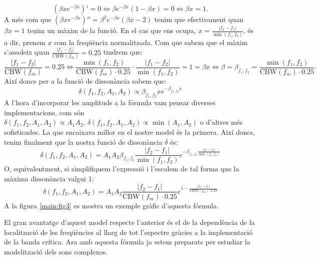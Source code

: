 \documentclass{article}
\theoremstyle{definition}
\begin{document}
$$\left(\beta xe^{-\beta x}\right)'=0\iff \beta e^{-\beta x}(1-\beta x)=0\iff\beta x=1.$$ A més com que $\left(\beta xe^{-\beta x}\right)''=\beta^2e^{-\beta x}(\beta x-2)$ tenim que efectivament quan $\beta x=1$ tenim un màxim de la funció.
En el cas que ens ocupa, $x=\frac{|f_2-f_1|}{\min(f_1,f_2)}$, és a dir, prenem $x$ com la freqüència normalitzada. Com que sabem que el màxim s'assoleix quan $\frac{|f_1-f_2|}{\text{CBW}(f_m)}=0.25$ tindrem que:
$$\frac{|f_1-f_2|}{\text{CBW}(f_m)}=0.25\iff\frac{\min(f_1, f_2)}{\text{CBW}(f_m)\cdot 0.25}\cdot\frac{|f_1-f_2|}{\min(f_1, f_2)}=1=\beta x\iff\beta=\beta_{f_1,f_2}=\frac{\min(f_1, f_2)}{\text{CBW}(f_m)\cdot 0.25}.$$
Així doncs per a la funció de dissonància sabem que: $$\delta(f_1,f_2,A_1,A_2)\propto\beta_{f_1,f_2}xe^{-\beta_{f_1,f_2}x}$$ A l'hora d'incorporar les amplituds a la fórmula vam pensar diverses implementacions, com són \\$\delta(f_1,f_2,A_1,A_2)\propto A_1A_2$, $\delta(f_1,f_2,A_1,A_2)\propto \min(A_1, A_2)$ o d'altres més sofisticades. La que encaixava millor en el nostre model és la primera. Així doncs, tenim finalment que la nostra funció de dissonància $\delta$ és:$$\delta(f_1,f_2,A_1,A_2)=A_1A_2\beta_{f_1,f_2}\frac{|f_2-f_1|}{\min(f_1,f_2)}e^{-\beta_{f_1,f_2}\frac{|f_2-f_1|}{\min(f_1,f_2)}}$$
O, equivalentment, si simplifiquem l'expressió i l'escalem de tal forma que la màxima dissonància valgui 1: 
\begin{equation}
    \delta(f_1,f_2,A_1,A_2)=A_1A_2\frac{|f_2-f_1|}{\text{CBW}(f_m)\cdot 0.25}e^{1-\frac{|f_2-f_1|}{\text{CBW}(f_m)\cdot 0.25}}
    \label{for:dissonancia}
\end{equation}
A la figura \ref{main:fig3} es mostra un exemple gràfic d'aquesta fórmula.
\begin{center}
    
    \label{main:fig3}
\end{center}
El gran avantatge d'aquest model respecte l'anterior és el de la dependència de la localització de les freqüències al llarg de tot l'espectre gràcies a la implementació de la banda crítica. Ara amb aquesta fórmula ja estem preparats per estudiar la modelització dels sons complexos.
\end{document}
